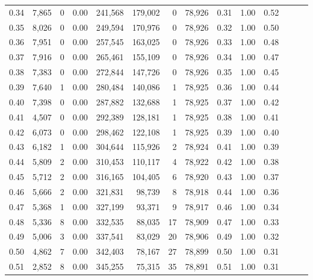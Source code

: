 \begin{tabular}{rrrrrrrrrrrrrr}
0.34 &   7,865 &      0 &  0.00 &  241,568 &  179,002 &       0 &  78,926 &  0.31 &  1.00 &      0.52 \\
0.35 &   8,026 &      0 &  0.00 &  249,594 &  170,976 &       0 &  78,926 &  0.32 &  1.00 &      0.50 \\
0.36 &   7,951 &      0 &  0.00 &  257,545 &  163,025 &       0 &  78,926 &  0.33 &  1.00 &      0.48 \\
0.37 &   7,916 &      0 &  0.00 &  265,461 &  155,109 &       0 &  78,926 &  0.34 &  1.00 &      0.47 \\
0.38 &   7,383 &      0 &  0.00 &  272,844 &  147,726 &       0 &  78,926 &  0.35 &  1.00 &      0.45 \\
0.39 &   7,640 &      1 &  0.00 &  280,484 &  140,086 &       1 &  78,925 &  0.36 &  1.00 &      0.44 \\
0.40 &   7,398 &      0 &  0.00 &  287,882 &  132,688 &       1 &  78,925 &  0.37 &  1.00 &      0.42 \\
0.41 &   4,507 &      0 &  0.00 &  292,389 &  128,181 &       1 &  78,925 &  0.38 &  1.00 &      0.41 \\
0.42 &   6,073 &      0 &  0.00 &  298,462 &  122,108 &       1 &  78,925 &  0.39 &  1.00 &      0.40 \\
0.43 &   6,182 &      1 &  0.00 &  304,644 &  115,926 &       2 &  78,924 &  0.41 &  1.00 &      0.39 \\
0.44 &   5,809 &      2 &  0.00 &  310,453 &  110,117 &       4 &  78,922 &  0.42 &  1.00 &      0.38 \\
0.45 &   5,712 &      2 &  0.00 &  316,165 &  104,405 &       6 &  78,920 &  0.43 &  1.00 &      0.37 \\
0.46 &   5,666 &      2 &  0.00 &  321,831 &   98,739 &       8 &  78,918 &  0.44 &  1.00 &      0.36 \\
0.47 &   5,368 &      1 &  0.00 &  327,199 &   93,371 &       9 &  78,917 &  0.46 &  1.00 &      0.34 \\
0.48 &   5,336 &      8 &  0.00 &  332,535 &   88,035 &      17 &  78,909 &  0.47 &  1.00 &      0.33 \\
0.49 &   5,006 &      3 &  0.00 &  337,541 &   83,029 &      20 &  78,906 &  0.49 &  1.00 &      0.32 \\
0.50 &   4,862 &      7 &  0.00 &  342,403 &   78,167 &      27 &  78,899 &  0.50 &  1.00 &      0.31 \\
0.51 &   2,852 &      8 &  0.00 &  345,255 &   75,315 &      35 &  78,891 &  0.51 &  1.00 &      0.31 \\

\end{tabular}
